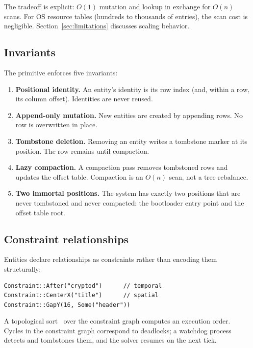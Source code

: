 \documentclass[11pt,a4paper]{article}
\begin{document}
The tradeoff is explicit: $O(1)$ mutation and lookup in exchange for $O(n)$ scans. For OS resource tables (hundreds to thousands of entries), the scan cost is negligible. Section~\ref{sec:limitations} discusses scaling behavior.

\subsection{Invariants}

The primitive enforces five invariants:

\begin{enumerate}
  \item \textbf{Positional identity.} An entity's identity is its row index (and, within a row, its column offset). Identities are never reused.
  \item \textbf{Append-only mutation.} New entities are created by appending rows. No row is overwritten in place.
  \item \textbf{Tombstone deletion.} Removing an entity writes a tombstone marker at its position. The row remains until compaction.
  \item \textbf{Lazy compaction.} A compaction pass removes tombstoned rows and updates the offset table. Compaction is an $O(n)$ scan, not a tree rebalance.
  \item \textbf{Two immortal positions.} The system has exactly two positions that are never tombstoned and never compacted: the bootloader entry point and the offset table root.
\end{enumerate}

\subsection{Constraint relationships}

Entities declare relationships as constraints rather than encoding them structurally:

\begin{lstlisting}[language={},numbers=none]
Constraint::After("cryptod")      // temporal
Constraint::CenterX("title")      // spatial
Constraint::GapY(16, Some("header"))
\end{lstlisting}

A topological sort~\citep{toposort} over the constraint graph computes an execution order. Cycles in the constraint graph correspond to deadlocks; a watchdog process detects and tombstones them, and the solver resumes on the next tick.
\end{document}
